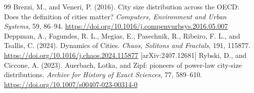 \documentclass[11pt]{article}
\theoremstyle{remark}
\begin{document}
\begin{thebibliography}{99}
		Brezzi, M., and Veneri, P. (2016). City size distribution across the OECD: Does the definition of cities matter? \emph{Computers, Environment and Urban Systems}, 59, 86–94. \url{https://doi.org/10.1016/j.compenvurbsys.2016.05.007}
		Deppman, A., Fagundes, R. L., Megias, E., Pasechnik, R., Ribeiro, F. L., and Tsallis, C. (2024). Dynamics of Cities. \emph{Chaos, Solitons and Fractals}, 191, 115877. \url{https://doi.org/10.1016/j.chaos.2024.115877} [arXiv:2407.12681]
		Rybski, D., and Ciccone, A. (2023). Auerbach, Lotka, and Zipf: pioneers of power-law city-size distributions. \emph{Archive for History of Exact Sciences}, 77, 589–610. \url{https://doi.org/10.1007/s00407-023-00314-0}
	\end{thebibliography}
	
\end{document}
